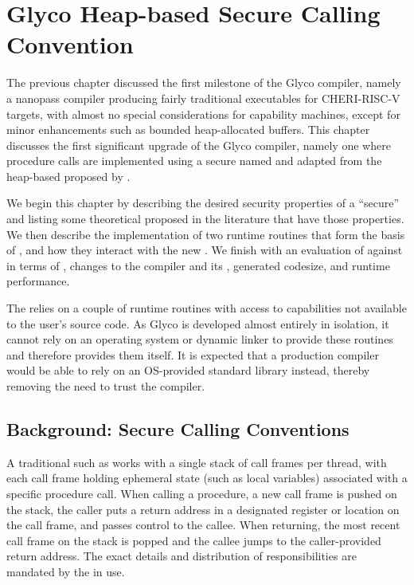 \documentclass[main.tex]{subfiles}
\begin{document}
\onlyinsubfile{\mainmatter{}}

\chapter{Glyco Heap-based Secure Calling Convention}
The previous chapter discussed the first milestone of the Glyco compiler, namely a nanopass compiler producing fairly traditional executables for CHERI-RISC-V targets, with almost no special considerations for capability machines, except for minor enhancements such as bounded heap-allocated buffers. This chapter discusses the first significant upgrade of the Glyco compiler, namely one where procedure calls are implemented using a secure \cc{} named \textbf{\ghscc{}} and adapted from the heap-based \cc{} proposed by \cite{cerise}.

We begin this chapter by describing the desired security properties of a \enquote{secure} \cc{} and listing some theoretical \ccs{} proposed in the literature that have those properties. We then describe the implementation of two runtime routines that form the basis of \ghscc{}, and how they interact with the new \cc{}. We finish with an evaluation of \ghscc{} against \gccc{} in terms of \lce{}, changes to the compiler and its \ils{}, generated codesize, and runtime performance.

The \cc{} relies on a couple of runtime routines with access to capabilities not available to the user's source code. As Glyco is developed almost entirely in isolation, it cannot rely on an operating system or dynamic linker to provide these routines and therefore provides them itself. It is expected that a production compiler would be able to rely on an OS-provided standard library instead, thereby removing the need to trust the compiler.

\section{Background: Secure Calling Conventions}
A traditional \cc{} such as \gccc{} works with a single stack of call frames per thread, with each call frame holding ephemeral state (such as local variables) associated with a specific procedure call. When calling a procedure, a new call frame is pushed on the stack, the caller puts a return address in a designated register or location on the call frame, and passes control to the callee. When returning, the most recent call frame on the stack is popped and the callee jumps to the caller-provided return address. The exact details and distribution of responsibilities are mandated by the \cc{} in use.
\end{document}

